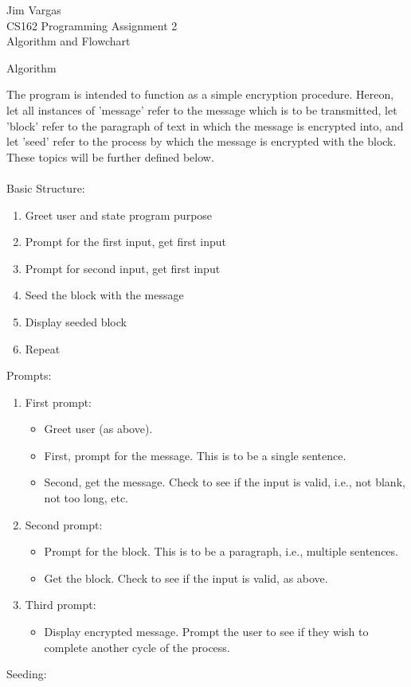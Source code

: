 \documentclass[12]{article}
\begin{document}
\onehalfspacing
\noindent
Jim Vargas\\
CS162 Programming Assignment 2\\
Algorithm and Flowchart\\
\begin{center}
Algorithm
\end{center}


	The program is intended to function as a simple encryption procedure. Hereon, let all instances of 'message' refer to the message which is to be transmitted, let 'block' refer to the paragraph of text in which the message is encrypted into, and let 'seed' refer to the process by which the message is encrypted with the block. These topics will be further defined below.\\
\\
Basic Structure:
\begin{enumerate}
\item Greet user and state program purpose
\item Prompt for the first input, get first input
\item Prompt for second input, get first input
\item Seed the block with the message
\item Display seeded block
\item Repeat
\end{enumerate}
	Prompts:
\begin{enumerate}
\item First prompt:
	\begin{itemize}
	\item Greet user (as above).
	\item First, prompt for the message. This is to be a single sentence. 
	\item Second, get the message. Check to see if the input is valid, i.e., not blank, not too long, etc.
	\end{itemize}
\item Second prompt:
	\begin{itemize}
	\item Prompt for the block. This is to be a paragraph, i.e., multiple sentences.
	\item Get the block. Check to see if the input is valid, as above.
	\end{itemize}
\item Third prompt:
	\begin{itemize}
	\item Display encrypted message. Prompt the user to see if they wish to complete another cycle of the process.
	\end{itemize}
\end{enumerate}
Seeding:
\end{document}
